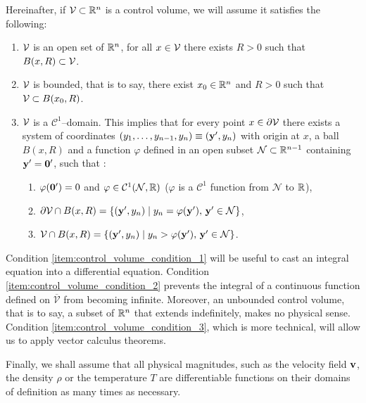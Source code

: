 \noindent
Hereinafter, if $\mathcal{V}_{} \subset \mathbb{R}^n$ is a control volume, we will assume it satisfies the following:
\begin{enumerate}[label={(\roman*)}, topsep=0pt]
	\item $\mathcal{V}_{}$ is an open set of $\mathbb{R}^n$, \ie for all $x \in \mathcal{V}_{}$
	there exists $R > 0$ such that $B(x, R) \subset \mathcal{V}_{}$.
	\label{item:control_volume_condition_1}
	\item $\mathcal{V}_{}$ is bounded, that is to say, there exist $x_0 \in \mathbb{R}^n$
	and $R > 0$ such that $\mathcal{V}_{} \subset B(x_0, R)$.
	\label{item:control_volume_condition_2}
	\item $\mathcal{V}_{}$ is a $\mathcal{C}^1$--domain. This implies that for every
	point $x \in \partial \mathcal{V}_{}$ there exists a system of coordinates
	$(y_1, \ldots, y_{n-1}, y_n) \equiv (\vb{y'}, y_n)$ with origin at $x$,
	a ball $B(x, R)$ and a function $\varphi$ defined in an open subset
	$\mathcal{N} \subset \mathbb{R}^{n-1}$ containing $\vb{y'} = \vb{0}'$, such that
	\cite{salsa2009pde}: \label{item:control_volume_condition_3}
	\begin{enumerate}[topsep=0pt]
		\item $\varphi(\vb{0'}) = 0$ and $\varphi \in \mathcal{C}^1(\mathcal{N},
		\mathbb{R})$ ($\varphi$ is a $\mathcal{C}^1$ function from $\mathcal{N}$ to
		$\mathbb{R}$),
		\item $\partial \mathcal{V}_{} \cap B(x, R) = \{ (\vb{y'}, y_n) \mid y_n =
		\varphi(\vb{y'}), \, \vb{y'} \in \mathcal{N} \}$,
		\item $\mathcal{V}_{} \cap B(x, R) = \{ (\vb{y'}, y_n) \mid y_n >
		\varphi(\vb{y'}), \, \vb{y'} \in \mathcal{N} \}$.
	\end{enumerate} 
\end{enumerate}
Condition \ref{item:control_volume_condition_1} will be useful to cast an
integral equation into a differential equation. Condition
\ref{item:control_volume_condition_2} prevents the integral of a continuous
function defined on $\overline{\mathcal{V}}$ from becoming infinite. Moreover,
an unbounded control volume, that is to say, a subset of $\mathbb{R}^n$ that extends
indefinitely, makes no physical sense. Condition
\ref{item:control_volume_condition_3}, which is more technical, will allow us to
apply vector calculus theorems.

Finally, we shall assume that all physical magnitudes, such as the velocity
field $\vb{v}$, the density $\rho$ or the temperature $T$ are differentiable
functions on their domains of definition as many times as necessary.





